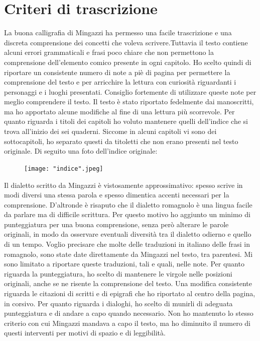 \documentclass[10pt]{memoir} %
\begin{document}
\chapter*{Criteri di trascrizione}
La buona calligrafia di Mingazzi ha permesso una facile trascrizione e una discreta comprensione dei concetti che voleva scrivere.\:Tuttavia il testo contiene alcuni errori grammaticali e frasi poco chiare che non permettono la comprensione dell'elemento comico presente in ogni capitolo. Ho scelto quindi di riportare un consistente numero di note a piè di pagina per permettere la comprensione del testo e per arricchire la lettura con curiosità riguardanti i personaggi e i luoghi presentati. Consiglio fortemente di utilizzare queste note per meglio comprendere il testo. Il testo è stato riportato fedelmente dai manoscritti, ma ho apportato alcune modifiche al fine di una lettura più scorrevole. Per quanto riguarda i titoli dei capitoli ho voluto mantenere quelli dell'indice che si trova all'inizio dei sei quaderni. Siccome in alcuni capitoli vi sono dei sottocapitoli, ho separato questi da titoletti che non erano presenti nel testo originale. \newpage
Di seguito una foto dell'indice originale:\\
\begin{figure}[H]
\begin{center}
\vspace{-20pt}
   \texttt{[image: "indice".jpeg]}\\
  \end{center}
\end{figure}
Il dialetto scritto da Mingazzi è vistosamente approssimativo: spesso scrive in modi diversi una stessa parola e spesso dimentica accenti necessari per la comprensione. D'altronde è risaputo che il dialetto romagnolo è una lingua facile da parlare ma di difficile scrittura. Per questo motivo ho aggiunto un minimo di punteggiatura per una buona comprensione, senza però alterare le parole originali, in modo da osservare eventuali diversità tra il dialetto odierno e quello di un tempo. Voglio precisare che molte delle traduzioni in italiano delle frasi in romagnolo, sono state date direttamente da Mingazzi nel testo, tra parentesi. Mi sono limitato a riportare queste traduzioni, tali e quali, nelle note. Per quanto riguarda la punteggiatura, ho scelto di mantenere le virgole nelle posizioni originali, anche se ne risente la comprensione del testo. Una modifica consistente riguarda le citazioni di scritti e di epigrafi che ho riportato al centro della pagina, in corsivo. Per quanto riguarda i dialoghi, ho scelto di munirli di adeguata punteggiatura e di andare a capo quando necessario. Non ho mantenuto lo stesso criterio con cui Mingazzi mandava a capo il testo, ma ho diminuito il numero di questi interventi per motivi di spazio e di leggibilità.	\\\\
\end{document}
